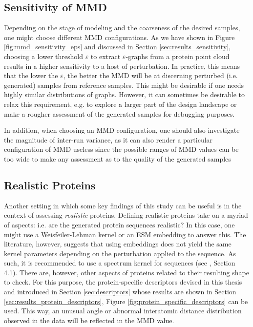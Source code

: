 \subsection{Sensitivity of MMD}\label{sec:discussion_right_mmd}
Depending on the stage of modeling and the coarseness of the desired samples,
one might choose different MMD configurations. As we have shown in Figure
\ref{fig:mmd_sensitivity_eps} and discussed in Section
\ref{sec:results_sensitivity}, choosing a lower threshold $\varepsilon$ to
extract $\varepsilon$-graphs from a protein point cloud results in a higher
sensitivity to a host of perturbation. In practice, this means that the lower the
$\varepsilon$, the better the MMD will be at discerning perturbed (i.e.
generated) samples from reference samples. This might be desirable if one needs
highly similar distributions of graphs. However, it can sometimes be desirable
to relax this requirement, e.g. to explore a larger part of the design landscape
or make a rougher assessment of the generated samples for debugging purposes.

In addition, when choosing an MMD configuration, one should also investigate the
magnitude of inter-run variance, as it can also render a particular
configuration of MMD useless since the possible ranges of MMD values can be too
wide to make any assessment as to the quality of the generated samples

\subsection{Realistic Proteins}\label{sec:discussion_realistic_proteins}

Another setting in which some key findings of this study can be useful is in the
context of assessing \emph{realistic} proteins. Defining realistic proteins take on a
myriad of aspects: i.e. are the generated protein sequences realistic? In this
case, one might use a Weisfeiler-Lehman kernel or an ESM embedding to answer
this. The literature, however, suggests that using embeddings does not yield the
same kernel parameters depending on the perturbation applied to the sequence. As
such, it is recommended to use a spectrum kernel \citep{leslie2001spectrum} for
sequences (see \cite{kucera2021conditional}, Section 4.1). There are, however,
other aspects of proteins related to their resulting shape to check. For this
purpose, the protein-specific descriptors devised in this thesis and introduced in
Section \ref{sec:descriptors} whose results are shown in Section
\ref{sec:results_protein_descriptors}, Figure
\ref{fig:protein_specific_descriptors} can be used. This way, an unusual angle
or abnormal interatomic distance distribution observed in the data will be
reflected in the MMD value.

